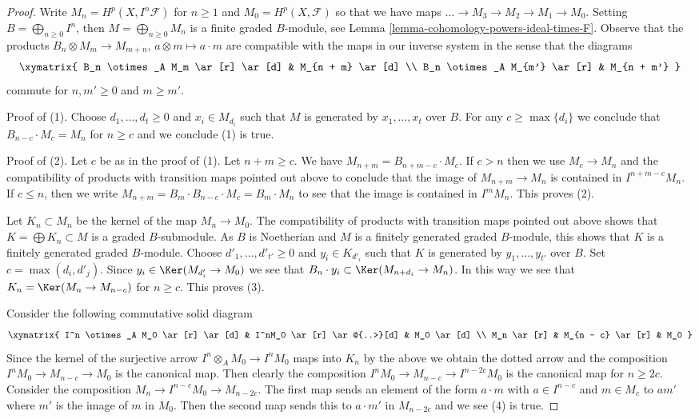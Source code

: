 \begin{proof}
Write $M_n = H^p(X, I^n\mathcal{F})$ for $n \geq 1$ and
$M_0 = H^p(X, \mathcal{F})$ so that we have maps
$\ldots \to M_3 \to M_2 \to M_1 \to M_0$. Setting
$B = \bigoplus_{n \geq 0} I^n$, then $M = \bigoplus_{n \geq 0} M_n$
is a finite graded $B$-module, see
Lemma \ref{lemma-cohomology-powers-ideal-times-F}.
Observe that the products
$B_n \otimes M_m \to M_{m + n}$, $a \otimes m \mapsto a \cdot m$
are compatible with the maps in our inverse system in the sense
that the diagrams
$$
\xymatrix{
B_n \otimes_A M_m \ar[r] \ar[d] & M_{n + m} \ar[d] \\
B_n \otimes_A M_{m'} \ar[r] & M_{n + m'}
}
$$
commute for $n, m' \geq 0$ and $m \geq m'$.

\medskip\noindent
Proof of (1). Choose $d_1, \ldots, d_t \geq 0$ and $x_i \in M_{d_i}$
such that $M$ is generated by $x_1, \ldots, x_t$ over $B$.
For any $c \geq \max\{d_i\}$ we conclude that
$B_{n - c} \cdot M_c = M_n$ for $n \geq c$ and we conclude (1) is true.

\medskip\noindent
Proof of (2). Let $c$ be as in the proof of (1). Let $n + m \geq c$.
We have $M_{n + m} = B_{n + m - c} \cdot M_c$.
If $c > n$ then we use $M_c \to M_n$ and the compatibility of products
with transition maps pointed out above to conclude that
the image of $M_{n + m} \to M_n$ is contained in $I^{n + m - c}M_n$.
If $c \leq n$, then we write $M_{n + m} = B_m \cdot B_{n - c} \cdot M_c =
B_m \cdot M_n$ to see that the image is contained in $I^m M_n$.
This proves (2).

\medskip\noindent
Let $K_n \subset M_n$ be the kernel of the map $M_n \to M_0$. The
compatibility of products with transition maps pointed out above
shows that $K = \bigoplus K_n \subset M$ is a graded $B$-submodule.
As $B$ is Noetherian and $M$ is a finitely generated graded $B$-module,
this shows that $K$ is a finitely generated graded $B$-module.
Choose $d'_1, \ldots, d'_{t'} \geq 0$ and $y_i \in K_{d'_i}$
such that $K$ is generated by $y_1, \ldots, y_{t'}$ over $B$.
Set $c = \max(d_i, d'_j)$. Since $y_i \in \Ker(M_{d'_i} \to M_0)$
we see that $B_n \cdot y_i \subset \Ker(M_{n + d_i} \to M_n)$.
In this way we see that $K_n = \Ker(M_n \to M_{n - c})$ for $n \geq c$.
This proves (3).

\medskip\noindent
Consider the following commutative solid diagram
$$
\xymatrix{
I^n \otimes_A M_0 \ar[r] \ar[d] &
I^nM_0 \ar[r] \ar@{..>}[d] &
M_0 \ar[d] \\
M_n \ar[r] &
M_{n - c} \ar[r] &
M_0
}
$$
Since the kernel of the surjective arrow $I^n \otimes_A M_0 \to I^nM_0$
maps into $K_n$ by the above we obtain the dotted arrow and the
composition $I^nM_0 \to M_{n - c} \to M_0$ is the canonical map.
Then clearly the composition $I^nM_0 \to M_{n - c} \to I^{n - 2c}M_0$
is the canonical map for $n \geq 2c$. Consider the composition
$M_n \to I^{n - c}M_0 \to M_{n - 2c}$. The first map
sends an element of the form $a \cdot m$
with $a \in I^{n - c}$ and $m \in M_c$
to $a m'$ where $m'$ is the image of $m$ in $M_0$.
Then the second map sends this to $a \cdot m'$ in $M_{n - 2c}$ and
we see (4) is true.


\end{proof}
